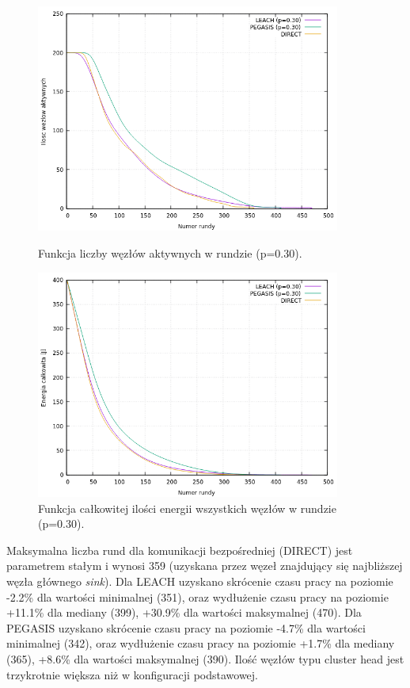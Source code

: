 \documentclass[a4paper,12pt,twoside,openany]{report}
\begin{document}
\begin{figure}[H]
 \centering
 \includegraphics[width=10cm]{images/gnuplot/test_4/nodes_in_round_p030.png}
 \caption{Funkcja liczby węzłów aktywnych w rundzie (p=0.30).}
 \includegraphics[width=10cm]{images/gnuplot/test_4/energy_in_round_p030.png}
 \caption{Funkcja całkowitej ilości energii wszystkich węzłów w rundzie (p=0.30).}
\end{figure}

\par
Maksymalna liczba rund dla komunikacji bezpośredniej (DIRECT) jest parametrem stałym i wynosi 359 (uzyskana przez węzeł znajdujący się najbliższej węzła głównego \textit{sink}).
Dla LEACH uzyskano skrócenie czasu pracy na poziomie -2.2\% dla wartości minimalnej (351), oraz wydłużenie czasu pracy na poziomie +11.1\% dla mediany (399), +30.9\% dla wartości maksymalnej (470).
Dla PEGASIS uzyskano skrócenie czasu pracy na poziomie -4.7\% dla wartości minimalnej (342), oraz wydłużenie czasu pracy na poziomie +1.7\% dla mediany (365), +8.6\% dla wartości maksymalnej (390).
Ilość węzłów typu cluster head jest trzykrotnie większa niż w konfiguracji podstawowej.
\end{document}
